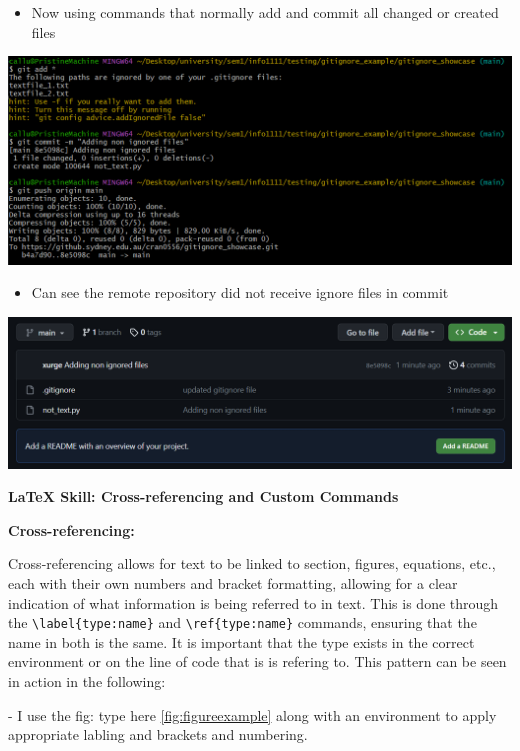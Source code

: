 \documentclass[a4paper, 11pt]{report}
\begin{document}
\begin{itemize}
\item Now using commands that normally add and commit all changed or created files 
\end{itemize}
\includegraphics[width=1.1\textwidth]{gitignoreaddall}
\begin{itemize}
\item Can see the remote repository did not receive ignore files in commit 
\end{itemize}
\includegraphics[width=1.1\textwidth]{gitignorerepo}

\vspace{\baselineskip}
 \textbf{\large{LaTeX Skill: Cross-referencing and Custom Commands}}

\vspace{\baselineskip}
 \textbf{Cross-referencing:}

Cross-referencing allows for text to be linked to section, figures, equations, etc., each with their own numbers and bracket formatting, allowing for a clear indication of what information is being referred to in text. This is done through the \verb|\label{type:name}| and \verb|\ref{type:name}| commands, ensuring that the name in both is the same. It is important that the type exists in the correct environment or on the line of code that is is refering to. This pattern can be seen in action in the following:

- I use the fig: type here \ref{fig:figureexample} along with an environment to apply appropriate labling and brackets and numbering. 
\end{document}
